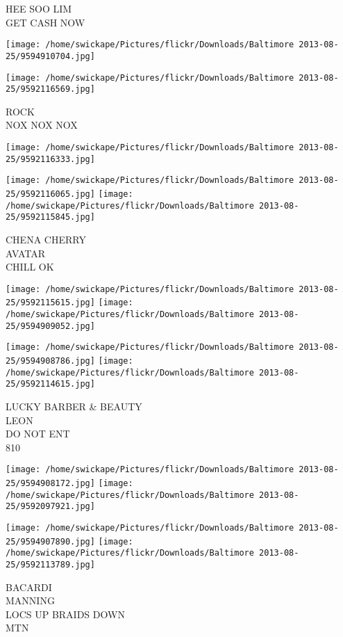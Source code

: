 \documentclass[10pt,letterpaper]{article}
\begin{document}
HEE SOO LIM\\
GET CASH NOW
\pagebreak

\texttt{[image: /home/swickape/Pictures/flickr/Downloads/Baltimore 2013-08-25/9594910704.jpg]}

\vspace{0.25in}
\texttt{[image: /home/swickape/Pictures/flickr/Downloads/Baltimore 2013-08-25/9592116569.jpg]}

ROCK\\
NOX NOX NOX
\pagebreak

\texttt{[image: /home/swickape/Pictures/flickr/Downloads/Baltimore 2013-08-25/9592116333.jpg]}

\vspace{0.25in}
\texttt{[image: /home/swickape/Pictures/flickr/Downloads/Baltimore 2013-08-25/9592116065.jpg]}
\texttt{[image: /home/swickape/Pictures/flickr/Downloads/Baltimore 2013-08-25/9592115845.jpg]}

CHENA CHERRY\\
AVATAR\\
CHILL OK
\pagebreak

\texttt{[image: /home/swickape/Pictures/flickr/Downloads/Baltimore 2013-08-25/9592115615.jpg]}
\texttt{[image: /home/swickape/Pictures/flickr/Downloads/Baltimore 2013-08-25/9594909052.jpg]}

\texttt{[image: /home/swickape/Pictures/flickr/Downloads/Baltimore 2013-08-25/9594908786.jpg]}
\texttt{[image: /home/swickape/Pictures/flickr/Downloads/Baltimore 2013-08-25/9592114615.jpg]}

LUCKY BARBER \& BEAUTY\\
LEON\\
DO NOT ENT\\
810
\pagebreak

\texttt{[image: /home/swickape/Pictures/flickr/Downloads/Baltimore 2013-08-25/9594908172.jpg]}
\texttt{[image: /home/swickape/Pictures/flickr/Downloads/Baltimore 2013-08-25/9592097921.jpg]}

\texttt{[image: /home/swickape/Pictures/flickr/Downloads/Baltimore 2013-08-25/9594907890.jpg]}
\texttt{[image: /home/swickape/Pictures/flickr/Downloads/Baltimore 2013-08-25/9592113789.jpg]}

BACARDI\\
MANNING\\
LOCS UP BRAIDS DOWN\\
MTN
\pagebreak
\end{document}

